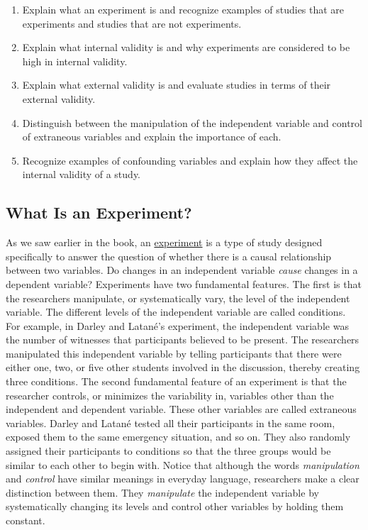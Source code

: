 \documentclass[
]{krantz}
\providecommand{\tightlist}{%
  \setlength{\itemsep}{0pt}\setlength{\parskip}{0pt}}
\begin{document}
\begin{enumerate}
\def\labelenumi{\arabic{enumi}.}
\tightlist
\item
  Explain what an experiment is and recognize examples of studies that are experiments and studies that are not experiments.
\item
  Explain what internal validity is and why experiments are considered to be high in internal validity.
\item
  Explain what external validity is and evaluate studies in terms of their external validity.
\item
  Distinguish between the manipulation of the independent variable and control of extraneous variables and explain the importance of each.
\item
  Recognize examples of confounding variables and explain how they affect the internal validity of a study.
\end{enumerate}

\subsection*{What Is an Experiment?}\label{what-is-an-experiment}


As we saw earlier in the book, an \hyperref[experiment]{experiment} is a type of study designed specifically to answer the question of whether there is a causal relationship between two variables. Do changes in an independent variable \emph{cause} changes in a dependent variable? Experiments have two fundamental features. The first is that the researchers manipulate, or systematically vary, the level of the independent variable. The different levels of the independent variable are called conditions. For example, in Darley and Latané's experiment, the independent variable was the number of witnesses that participants believed to be present. The researchers manipulated this independent variable by telling participants that there were either one, two, or five other students involved in the discussion, thereby creating three conditions. The second fundamental feature of an experiment is that the researcher controls, or minimizes the variability in, variables other than the independent and dependent variable. These other variables are called extraneous variables. Darley and Latané tested all their participants in the same room, exposed them to the same emergency situation, and so on. They also randomly assigned their participants to conditions so that the three groups would be similar to each other to begin with. Notice that although the words \emph{manipulation} and \emph{control} have similar meanings in everyday language, researchers make a clear distinction between them. They \emph{manipulate} the independent variable by systematically changing its levels and control other variables by holding them constant.
\end{document}
